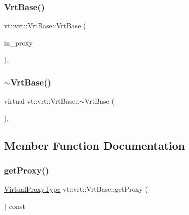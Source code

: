 \subsubsection{\texorpdfstring{Vrt\+Base()}{VrtBase()}\hspace{0.1cm}{\footnotesize\ttfamily [2/2]}}
{\footnotesize\ttfamily vt\+::vrt\+::\+Vrt\+Base\+::\+Vrt\+Base (\begin{DoxyParamCaption}\item[{\hyperlink{namespacevt_a1b417dd5d684f045bb58a0ede70045ac}{Virtual\+Proxy\+Type} const \&}]{in\+\_\+proxy }\end{DoxyParamCaption})\hspace{0.3cm}{\ttfamily [inline]}, {\ttfamily [explicit]}}

\mbox{\label{structvt_1_1vrt_1_1_vrt_base_a16d15fcaabbf2e477315466dcaaa6f84}} 
\subsubsection{\texorpdfstring{$\sim$\+Vrt\+Base()}{~VrtBase()}}
{\footnotesize\ttfamily virtual vt\+::vrt\+::\+Vrt\+Base\+::$\sim$\+Vrt\+Base (\begin{DoxyParamCaption}{ }\end{DoxyParamCaption})\hspace{0.3cm}{\ttfamily [inline]}, {\ttfamily [virtual]}}



\subsection{Member Function Documentation}
\mbox{\label{structvt_1_1vrt_1_1_vrt_base_a30ea8cc8e915777f3106038c73cdb499}} 
\subsubsection{\texorpdfstring{get\+Proxy()}{getProxy()}}
{\footnotesize\ttfamily \hyperlink{namespacevt_a1b417dd5d684f045bb58a0ede70045ac}{Virtual\+Proxy\+Type} vt\+::vrt\+::\+Vrt\+Base\+::get\+Proxy (\begin{DoxyParamCaption}{ }\end{DoxyParamCaption}) const\hspace{0.3cm}{\ttfamily [inline]}}

